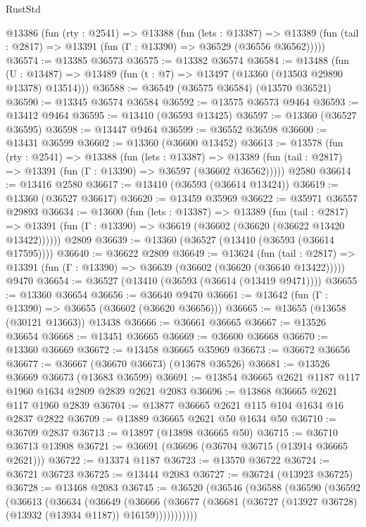 \begin{lexlean}{RustStd}
\begin{coremodule}
  @13386
    (fun (rty : @2541) =>
    @13388
      (fun (lets : @13387) =>
      @13389 (fun (tail : @2817) => @13391 (fun (Γ : @13390) => @36529 (@36556 @36562)))))
@36574 := @13385 @36573
@36575 := @13382 @36574
@36584 := @13488
    (fun (U : @13487) => @13489 (fun (t : @7) => @13497 (@13360 (@13503 @29890 @13378) @13514)))
@36588 := @36549 (@36575 @36584) (@13570 @36521)
@36590 := @13345 @36574 @36584
@36592 := @13575 @36573 @9464
@36593 := @13412 @9464
@36595 := @13410 (@36593 @13425)
@36597 := @13360 (@36527 @36595)
@36598 := @13447 @9464
@36599 := @36552 @36598
@36600 := @13431 @36599
@36602 := @13360 (@36600 @13452)
@36613 := @13578
    (fun (rty : @2541) =>
    @13388
      (fun (lets : @13387) =>
      @13389 (fun (tail : @2817) => @13391 (fun (Γ : @13390) => @36597 (@36602 @36562)))))
    @2580
@36614 := @13416 @2580
@36617 := @13410 (@36593 (@36614 @13424))
@36619 := @13360 (@36527 @36617)
@36620 := @13459 @35969
@36622 := @35971 @36557 @29893
@36634 := @13600
    (fun (lets : @13387) =>
    @13389
      (fun (tail : @2817) =>
      @13391 (fun (Γ : @13390) => @36619 (@36602 (@36620 (@36622 @13420 @13422))))))
    @2809
@36639 := @13360 (@36527 (@13410 (@36593 (@36614 @17595))))
@36640 := @36622 @2809
@36649 := @13624
    (fun (tail : @2817) => @13391 (fun (Γ : @13390) => @36639 (@36602 (@36620 (@36640 @13422)))))
    @9470
@36654 := @36527 (@13410 (@36593 (@36614 (@13419 @9471))))
@36655 := @13360 @36654
@36656 := @36640 @9470
@36661 := @13642 (fun (Γ : @13390) => @36655 (@36602 (@36620 @36656)))
@36665 := @13655 (@13658 (@30121 @13663)) @13438
@36666 := @36661 @36665
@36667 := @13526 @36654
@36668 := @13451 @36665
@36669 := @36600 @36668
@36670 := @13360 @36669
@36672 := @13458 @36665 @35969
@36673 := @36672 @36656
@36677 := @36667 (@36670 @36673) (@13678 @36526)
@36681 := @13526 @36669 @36673 (@13683 @36599)
@36691 := @13854 @36665 @2621 @1187 @117 @1960 @1634 @2809 @2839 @2621 @2083
@36696 := @13868 @36665 @2621 @117 @1960 @2839
@36704 := @13877 @36665 @2621 @115 @104 @1634 @16 @2837 @2822
@36709 := @13889 @36665 @2621 @50 @1634 @50
@36710 := @36709 @2837
@36713 := @13897 (@13898 @36665 @50)
@36715 := @36710 @36713 @13908
@36721 := @36691 (@36696 (@36704 @36715 (@13914 @36665 @2621)))
@36722 := @13374 @1187
@36723 := @13570 @36722
@36724 := @36721 @36723
@36725 := @13444 @2083
@36727 := @36724 (@13923 @36725)
@36728 := @13468 @2083
@36745 := @36520
    (@36546
      (@36588
        (@36590
          (@36592
            (@36613
              (@36634
                (@36649
                  (@36666
                    (@36677
                      (@36681 (@36727 (@13927 @36728) (@13932 (@13934 @1187)) @16159)))))))))))

\end{coremodule}
\end{lexlean}
